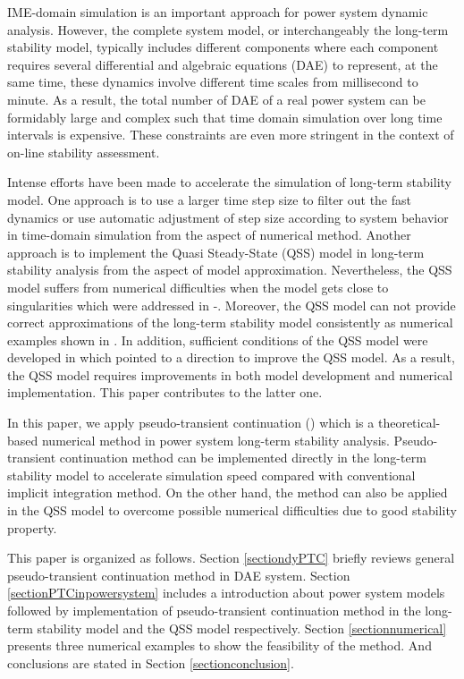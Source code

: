 \documentclass[journal]{IEEEtran}
\begin{document}
IME-domain simulation is an important approach for power system dynamic analysis. However, the complete system model, or interchangeably the long-term stability model, typically includes different components where each component requires several differential and algebraic equations (DAE) to represent, at the same time, these dynamics involve different time scales from millisecond to minute. As a result, the total number of DAE of a real power system can be formidably large and complex such that time domain simulation over long time intervals is expensive\cite{Chiang:book}. These constraints are even more stringent in the context of on-line stability assessment.

Intense efforts have been made to accelerate the simulation of long-term stability model. One approach is to use a larger time step size to filter out the fast dynamics or use automatic adjustment of step size according to system behavior in time-domain simulation \cite{Kundur:book}\cite{Kurita:article}\cite{Cutsem:book} from the aspect of numerical method. Another approach is to implement the Quasi Steady-State (QSS) model in long-term stability analysis \cite{Cutsem:book}\cite{Cutsem:artical} from the aspect of model approximation. Nevertheless, the QSS model suffers from numerical difficulties when the model gets close to singularities which were addressed in \cite{Cutsem:artical2}-\cite{Wang:artical}. Moreover, the QSS model can not provide correct approximations of the long-term stability model consistently as numerical examples shown in \cite{Wangxz:article}\cite{Wangxz:wiley}. In addition, sufficient conditions of the QSS model were developed in \cite{Wangxz:journal} which pointed to a direction to improve the QSS model. As a result, the QSS model requires improvements in both model development and numerical implementation. This paper contributes to the latter one.


In this paper, we apply pseudo-transient continuation () which is a theoretical-based numerical method in power system long-term stability analysis. Pseudo-transient continuation method can be implemented directly in the long-term stability model to accelerate simulation speed compared with conventional implicit integration method. On the other hand, the method can also be applied in the QSS model to overcome possible numerical difficulties due to good stability property.

This paper is organized as follows. Section \ref{sectiondyPTC} briefly reviews general pseudo-transient continuation method in DAE system. Section \ref{sectionPTCinpowersystem} includes a introduction about power system models followed by implementation of pseudo-transient continuation method in the long-term stability model and the QSS model respectively. Section \ref{sectionnumerical} presents three numerical examples to show the feasibility of the method. And conclusions are stated in Section \ref{sectionconclusion}. 
\end{document}
